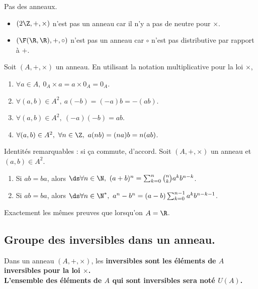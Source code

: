 \documentclass[11pt]{article}
\begin{document}
\begin{ex}{Pas des anneaux.}{}
    \begin{itemize}
        \item $(2\Z,+,\times)$ n'est pas un anneau car il n'y a pas de neutre pour $\times$.
        \item $(\F(\R,\R),+,\circ)$ n'est pas un anneau car $\circ$ n'est pas distributive par rapport à $+$.
    \end{itemize}
\end{ex}

\begin{prop}{}{}
    Soit $(A,+,\times)$ un anneau. En utilisant la notation multiplicative pour la loi $\times$,
    \begin{enumerate}
        \item $\forall a \in A, ~ 0_A\times a = a \times 0_A = 0_A$.
        \item $\forall (a,b)\in A^2, ~ a(-b)=(-a)b=-(ab)$.
        \item $\forall (a,b)\in A^2, ~ (-a)(-b)=ab$.
        \item $\forall (a,b)\in A^2, ~ \forall n \in \Z, ~ a(nb)=(na)b=n(ab)$.
    \end{enumerate}
\end{prop}

\begin{prop}{Identités remarquables : si ça commute, d'accord.}{}
    Soit $(A,+,\times)$ un anneau et $(a,b)\in A^2$.
    \begin{enumerate}
        \item Si $ab=ba$, alors $\ds\forall n \in \N, ~ (a+b)^n=\sum_{k=0}^n\binom{n}{k}a^kb^{n-k}$.
        \item Si $ab=ba$, alors $\ds\forall n \in \N^*, ~ a^n-b^n=(a-b)\sum_{k=0}^{n-1}a^kb^{n-k-1}$.
    \end{enumerate}
    \tcblower
    Exactement les mêmes preuves que lorsqu'on $A=\R$.
\end{prop}

\subsection{Groupe des inversibles dans un anneau.}

\begin{defi}{}{}
    Dans un anneau $(A,+,\times)$, les \bf{inversibles} sont les éléments de $A$ inversibles pour la loi $\times$.\\
    L'ensemble des éléments de $A$ qui sont inversibles sera noté $U(A)$.
\end{defi}
\end{document}
